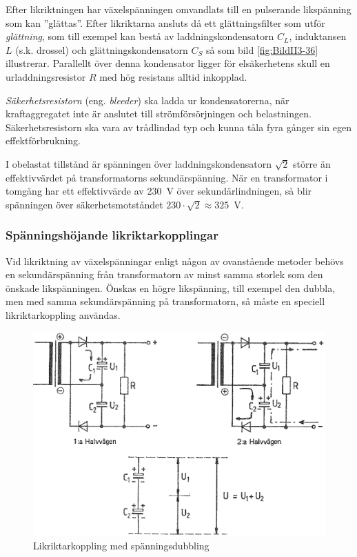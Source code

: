 Efter likriktningen har växelspänningen omvandlats till en pulserande
likspänning som kan ''glättas''.
Efter likriktarna ansluts då ett glättningsfilter som utför \emph{glättning},
som till exempel kan bestå av laddningskondensatorn \(C_L\), induktansen \(L\) (s.k.
drossel) och glättningskondensatorn \(C_S\) så som bild \ref{fig:BildII3-36}
illustrerar.
Parallellt över denna kondensator ligger för elsäkerhetens skull en
urladdningsresistor \(R\) med hög resistans alltid inkopplad.

\emph{Säkerhetsresistorn} (eng. \emph{bleeder}) ska ladda ur kondensatorerna,
när kraftaggregatet inte är anslutet till strömförsörjningen och belastningen.
Säkerhetsresistorn ska vara av trådlindad typ och kunna tåla fyra gånger sin
egen effektförbrukning.

I obelastat tillstånd är spänningen över laddningskondensatorn \(\sqrt{2}\)
större än effektivvärdet på transformatorns sekundärspänning.
När en transformator i tomgång har ett effektivvärde av 230~V över
sekundärlindningen, så blir spänningen över säkerhetsmotståndet
\(230\cdot\sqrt{2} \approx 325\)~V.

\subsubsection{Spänningshöjande likriktarkopplingar}

Vid likriktning av växelspänningar enligt någon av ovanstående metoder behövs
en sekundärspänning från transformatorn av minst samma storlek som den önskade
likspänningen.
Önskas en högre likspänning, till exempel den dubbla, men med samma sekundärspänning
på transformatorn, så måste en speciell likriktarkoppling användas.

\begin{figure}
\includegraphics[width=\textwidth]{images/cropped_pdfs/bild_2_3-37.pdf}
\caption{Likriktarkoppling med spänningsdubbling}
\label{fig:BildII3-37}
\end{figure}

